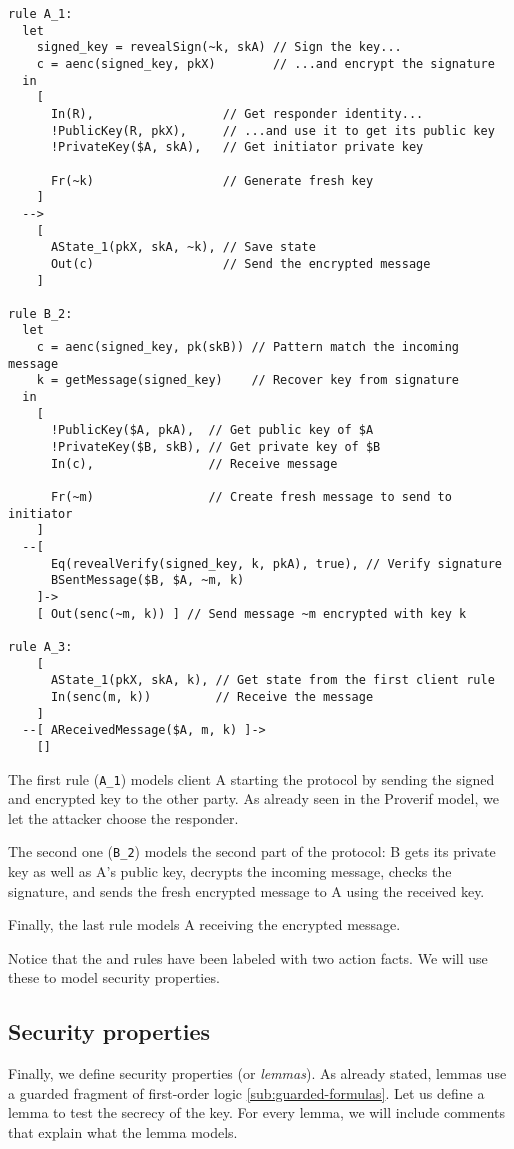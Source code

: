 \begin{lstlisting}
rule A_1:
  let
    signed_key = revealSign(~k, skA) // Sign the key...
    c = aenc(signed_key, pkX)        // ...and encrypt the signature
  in
    [ 
      In(R),                  // Get responder identity...
      !PublicKey(R, pkX),     // ...and use it to get its public key
      !PrivateKey($A, skA),   // Get initiator private key

      Fr(~k)                  // Generate fresh key
    ]
  -->
    [ 
      AState_1(pkX, skA, ~k), // Save state
      Out(c)                  // Send the encrypted message 
    ]

rule B_2:
  let
    c = aenc(signed_key, pk(skB)) // Pattern match the incoming message
    k = getMessage(signed_key)    // Recover key from signature
  in
    [ 
      !PublicKey($A, pkA),  // Get public key of $A
      !PrivateKey($B, skB), // Get private key of $B
      In(c),                // Receive message
      
      Fr(~m)                // Create fresh message to send to initiator
    ]
  --[ 
      Eq(revealVerify(signed_key, k, pkA), true), // Verify signature
      BSentMessage($B, $A, ~m, k)
    ]->
    [ Out(senc(~m, k)) ] // Send message ~m encrypted with key k 

rule A_3:
    [ 
      AState_1(pkX, skA, k), // Get state from the first client rule
      In(senc(m, k))         // Receive the message
    ]
  --[ AReceivedMessage($A, m, k) ]-> 
    []
\end{lstlisting}

The first rule (\lstinline{A_1}) models client A starting the protocol by sending the signed and encrypted key to the other party. As already seen in the Proverif model, we let the attacker choose the responder.

The second one (\lstinline{B_2}) models the second part of the protocol: B gets its private key as well as A's public key, decrypts the incoming message, checks the signature, and sends the fresh encrypted message to A using the received key.

Finally, the last rule models A receiving the encrypted message.

Notice that the  and  rules have been labeled with two action facts. We will use these to model security properties.

\subsection{Security properties}
Finally, we define security properties (or \textit{lemmas}). As already stated, lemmas use a guarded fragment of first-order logic \cref{sub:guarded-formulas}. Let us define a lemma to test the secrecy of the key. For every lemma, we will include comments that explain what the lemma models.

